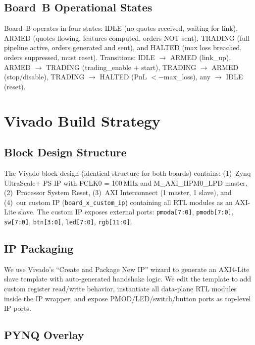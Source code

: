 \documentclass[conference]{IEEEtran}
\begin{document}
\subsection{Board~B Operational States}

Board~B operates in four states: IDLE (no quotes received, waiting for link), ARMED (quotes flowing, features computed, orders NOT sent), TRADING (full pipeline active, orders generated and sent), and HALTED (max loss breached, orders suppressed, must reset). Transitions: IDLE $\rightarrow$ ARMED (link\_up), ARMED $\rightarrow$ TRADING (trading\_enable + start), TRADING $\rightarrow$ ARMED (stop/disable), TRADING $\rightarrow$ HALTED (PnL $< -$max\_loss), any $\rightarrow$ IDLE (reset).

\section{Vivado Build Strategy}

\subsection{Block Design Structure}

The Vivado block design (identical structure for both boards) contains: (1)~Zynq UltraScale+ PS IP with FCLK0 = 100\,MHz and M\_AXI\_HPM0\_LPD master, (2)~Processor System Reset, (3)~AXI Interconnect (1 master, 1 slave), and (4)~our custom IP (\texttt{board\_x\_custom\_ip}) containing all RTL modules as an AXI-Lite slave. The custom IP exposes external ports: \texttt{pmoda[7:0]}, \texttt{pmodb[7:0]}, \texttt{sw[7:0]}, \texttt{btn[3:0]}, \texttt{led[7:0]}, \texttt{rgb[11:0]}.

\subsection{IP Packaging}

We use Vivado's ``Create and Package New IP'' wizard to generate an AXI4-Lite slave template with auto-generated handshake logic. We edit the template to add custom register read/write behavior, instantiate all data-plane RTL modules inside the IP wrapper, and expose PMOD/LED/switch/button ports as top-level IP ports.

\subsection{PYNQ Overlay}
\end{document}
